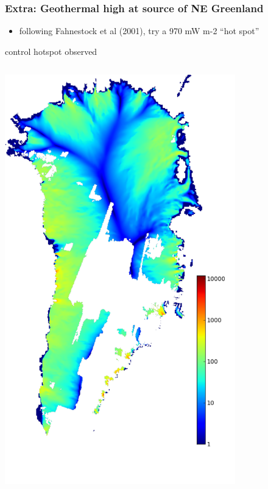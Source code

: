 \documentclass{beamer}
\begin{document}
\begin{frame}
  \frametitle{Extra: Geothermal high at source of NE Greenland}

\begin{itemize}\small
\item following Fahnestock et al (2001), try a 970 mW m-2 ``hot spot''
\end{itemize}
\vspace{-0.1in}

\begin{center}
control \hfill hotspot \hfill observed
\end{center}
\vspace{-0.15in}

\begin{columns}
\begin{column}{0.33\textwidth}
\begin{center}
  \includegraphics[width=0.75\textwidth]{g3km_3_25_98}
\end{center}

\end{column}
\end{columns}
\end{frame}
\end{document}
